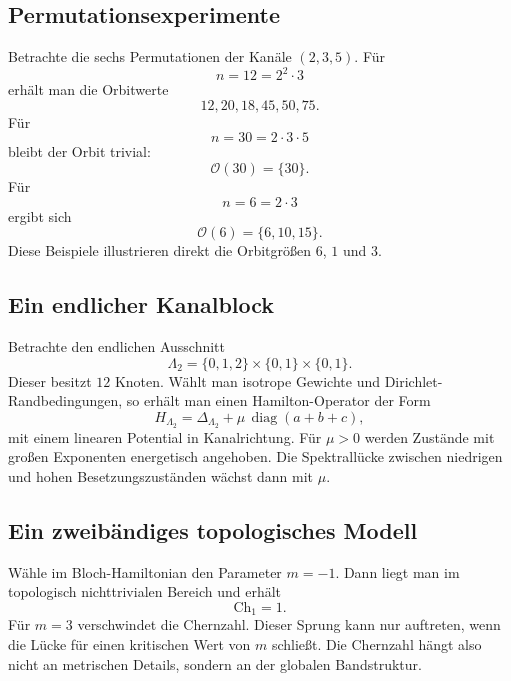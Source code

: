 \documentclass[11pt,a4paper]{article}
\theoremstyle{remark}
\newcommand{\OO}{\mathcal{O}}
\newcommand{\diag}{\operatorname{diag}}
\begin{document}
	\subsection{Permutationsexperimente}
	Betrachte die sechs Permutationen der Kanäle $(2,3,5)$. Für
	\begin{equation}
		n=12=2^2\cdot 3
	\end{equation}
	erhält man die Orbitwerte
	\begin{equation}
		12,20,18,45,50,75.
	\end{equation}
	Für
	\begin{equation}
		n=30=2\cdot 3\cdot 5
	\end{equation}
	bleibt der Orbit trivial:
	\begin{equation}
		\OO(30)=\{30\}.
	\end{equation}
	Für
	\begin{equation}
		n=6=2\cdot 3
	\end{equation}
	ergibt sich
	\begin{equation}
		\OO(6)=\{6,10,15\}.
	\end{equation}
	Diese Beispiele illustrieren direkt die Orbitgrößen $6$, $1$ und $3$.
	
	\subsection{Ein endlicher Kanalblock}
	Betrachte den endlichen Ausschnitt
	\begin{equation}
		\Lambda_2=\{0,1,2\}\times\{0,1\}\times\{0,1\}.
	\end{equation}
	Dieser besitzt $12$ Knoten. Wählt man isotrope Gewichte und Dirichlet-Randbedingungen, so erhält man einen Hamilton-Operator der Form
	\begin{equation}
		H_{\Lambda_2}=\Delta_{\Lambda_2}+\mu\,\diag(a+b+c),
	\end{equation}
	mit einem linearen Potential in Kanalrichtung. Für $\mu>0$ werden Zustände mit großen Exponenten energetisch angehoben. Die Spektrallücke zwischen niedrigen und hohen Besetzungszuständen wächst dann mit $\mu$.
	
	\subsection{Ein zweibändiges topologisches Modell}
	Wähle im Bloch-Hamiltonian den Parameter $m=-1$. Dann liegt man im topologisch nichttrivialen Bereich und erhält
	\begin{equation}
		\mathrm{Ch}_1=1.
	\end{equation}
	Für $m=3$ verschwindet die Chernzahl. Dieser Sprung kann nur auftreten, wenn die Lücke für einen kritischen Wert von $m$ schließt. Die Chernzahl hängt also nicht an metrischen Details, sondern an der globalen Bandstruktur.
	
\end{document}
